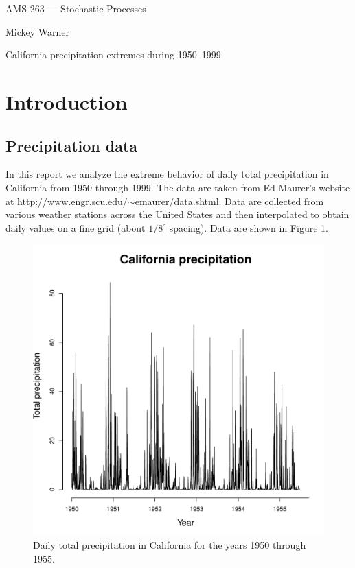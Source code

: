 \documentclass[12pt]{article}
\begin{document}
\noindent AMS 263 --- Stochastic Processes

\noindent Mickey Warner
\bigskip

\begin{center}
\begin{large}
California precipitation extremes during 1950--1999
\end{large}
\end{center}

\section*{Introduction}

\subsection*{Precipitation data}

\noindent In this report we analyze the extreme behavior of daily total precipitation in California from 1950 through 1999. The data are taken from Ed Maurer's website at http://www.engr.scu.edu/$\sim$emaurer/data.shtml. Data are collected from various weather stations across the United States and then interpolated to obtain daily values on a fine grid (about $1/8^\circ$ spacing). Data are shown in Figure 1.

\begin{figure}[H]
\begin{center}
\includegraphics[scale=0.40]{../figs/data.pdf}
\end{center}
\caption{Daily total precipitation in California for the years 1950 through 1955.}
\end{figure}
\end{document}
